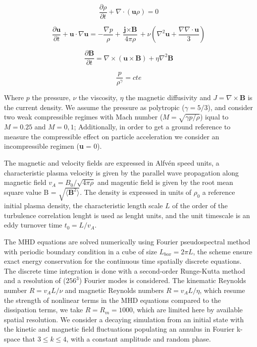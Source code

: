 \documentclass[11pt,twocolumn]{article}
\begin{document}
\begin{equation}
 \frac{\partial \rho}{\partial t} + \nabla \cdot (\textbf{u}\rho) = 0
\end{equation}

\begin{equation}
 \frac{\partial \textbf{u}}{\partial t} + \textbf{u} \cdot \nabla \textbf{u} = - \frac{\nabla p}{\rho} + \frac{\textbf{j} \times \textbf{B}}{4\pi\rho} 
 + \nu \left( \nabla^2 \textbf{u} +    \frac{\nabla \nabla \cdot \textbf{u} }{3} \right)
\end{equation}

\begin{equation}
\frac{\partial \textbf{B}}{\partial t} = \nabla \times (\textbf{u} \times \textbf{B}) + \eta \nabla^2 \textbf{B}
\end{equation}

\begin{equation}
 \frac{p}{\rho^{\gamma}} = cte
\end{equation}


Where $p$ the pressure, $\nu$ the viscosity, $\eta$ the magnetic diffusivity and $J=\nabla \times \textbf{B} $ is the current density. We assume the pressure as polytropic ($\gamma=5/3$), and consider two weak compressible regimes with Mach number ($M= \sqrt{\gamma p/\rho}$) iqual to $M=0.25$ and $M=0,1$; Additionally, in order to get a ground reference to measure the compressible effect on particle acceleration we consider an incompressible regimen (\nabla \cdot \textbf{u} = 0).

The magnetic and velocity fields are expressed in Alfv\'en speed units, a characteristic plasma velocity is given by the parallel wave propagation along magnetic field $v_A = B_0/\sqrt{4\pi\rho}$ and magentic field is given by the root mean square value \delta B = $\sqrt{\langle\textbf{B}^2\rangle}$. The density is expressed in units of $\rho_0$ a reference initial plasma density, the characteristic length scale $L$ of the order of the turbulence correlation lenght is used as lenght units, and the unit timescale is an eddy turnover time $t_0=L/v_A$.

The MHD equations are solved numerically using Fourier pseudospectral method with periodic boundary condition in a cube of size  $L_{box}=2\pi L$, the scheme ensure exact energy conservation for the continuous time spatially discrete equations. The discrete time integration is done with a second-order Runge-Kutta method and a  resolution of ($256^3$) Fourier modes is considered. The kinematic Reynolds number $R=v_AL/\nu$ and magnetic Reynolds numbers $R=v_AL/\eta$, which resume the strength of nonlinear terms in the MHD equations compared to the dissipation terms, we take $R=R_m= 1000$, which are limited here by available spatial resolution. We consider a decaying simulation from an initial state with the kinetic and magnetic field fluctuations populating an annulus in Fourier k-space that $ 3\leq k \leq4$, with a constant amplitude and random phase.
\end{document}
